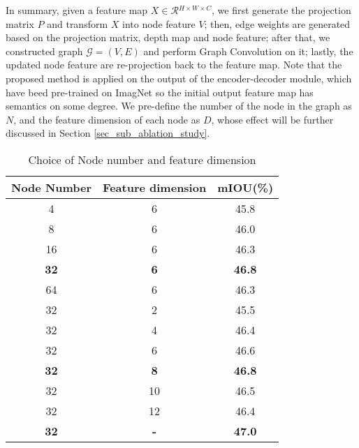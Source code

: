 \documentclass[journal]{IEEEtran}
\begin{document}
        In summary, given a feature map ${X} \in \mathcal{R}{^{H\times W\times C}}$, we first generate the projection matrix ${P}$ and transform $X$ into node feature $V$; then, edge weights are generated based on the projection matrix, depth map and node feature; after that, we constructed graph  $\mathcal{G}=(V, E)$ and perform Graph Convolution on it; lastly, the updated node feature are re-projection back to the feature map. Note that the proposed method is applied on the output of the encoder-decoder module, which have beed pre-trained on ImagNet so the initial output feature map has semantics on some degree. We pre-define the number of the node in the graph as $N$, and the feature dimension of each node as $D$, whose effect will be further discussed in Section \ref{sec_sub_ablation_study}. \\   
            
\begin{table}
    \caption{Choice of Node number and feature dimension}
    \label{table_ablation_node_dim}
    \centering
    \begin{tabular}{c|c|c}
        \hline
        Node Number & Feature dimension  & mIOU(\%) \\
        \hline
        4 & 6 & 45.8 \\
        8 & 6 & 46.0 \\
        16 & 6 & 46.3 \\
        \textbf{32} & \textbf{6} & \textbf{46.8}\\
        64 & 6 & 46.3 \\
        \hline
        32 & 2 & 45.5 \\
        32 & 4 & 46.4 \\
        32 & 6 & 46.6 \\
        \textbf{32} & \textbf{8} & \textbf{46.8} \\
        32 & 10 & 46.5 \\
        32 & 12 & 46.4 \\
        \hline
        \textbf{32} & \textbf{-} & \textbf{47.0} \\
        \hline
    \end{tabular}
    \end{table}
\end{document}
